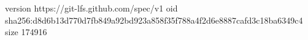 version https://git-lfs.github.com/spec/v1
oid sha256:d8d6b13d770d7fb849a92bd923a858f35f788a4f2d6e8887cafd3c18ba6349c4
size 174916
